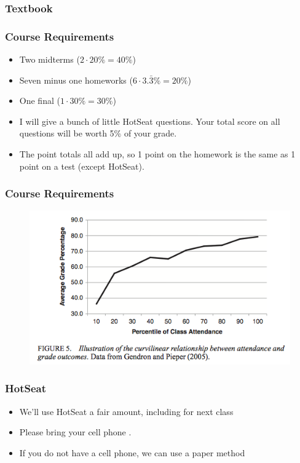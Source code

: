 \documentclass{beamer}
\begin{document}
\begin{frame}
\frametitle[alignment=center]{Textbook}
\end{frame}

\begin{frame}
\frametitle[alignment=center]{Course Requirements}
\begin{itemize}
\item Two midterms ($2\cdot20\%=40\%$)
\bigskip
\item Seven minus one homeworks ($6\cdot3.\bar{3}\%=20\%$)
\bigskip
\item One final ($1\cdot30\%=30\%$)
\bigskip
\item I will give a bunch of little HotSeat questions.  Your total score on all questions will be worth 5\% of your grade.
\bigskip
\item The point totals all add up, so 1 point on the homework is the same as 1 point on a test (except HotSeat).  
\end{itemize}
\end{frame}

\begin{frame}
\frametitle[alignment=center]{Course Requirements}
\begin{figure}
\includegraphics[scale=0.62]{Attendance.png}
\end{figure}
\end{frame}


\begin{frame}
\frametitle[alignment=center]{HotSeat}
\begin{itemize}
\item We'll use HotSeat a fair amount, including for next class
\bigskip
\item Please bring your cell phone .
\bigskip
\item If you do not have a cell phone, we can use a paper method
\end{itemize}
\end{frame}
\end{document}
